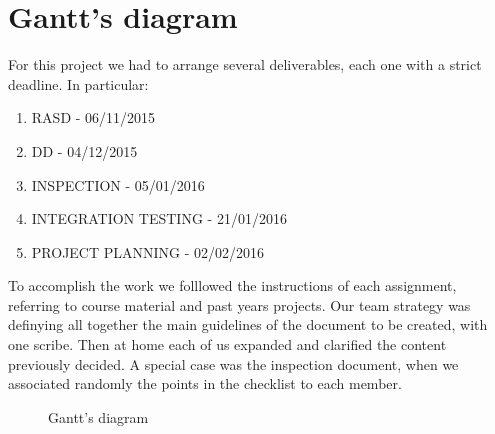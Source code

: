 \section{ Gantt's diagram}
For this project we had to arrange several deliverables, each one with a strict deadline.
In particular:
\begin{enumerate}
\item RASD - 06/11/2015
\item DD - 04/12/2015
\item INSPECTION - 05/01/2016
\item INTEGRATION TESTING - 21/01/2016
\item PROJECT PLANNING - 02/02/2016
\end{enumerate}

To accomplish the work we folllowed the instructions of each assignment, referring 
to course material and past years projects.
Our team strategy was definying  all together the main guidelines of the document to be created, with one 
scribe. Then at home each of us expanded and clarified the content previously decided.
A special case was the inspection document, when we associated randomly the points in the checklist to each member.

\begin{center}
\begin{figure} [h]

\noindent{}

\caption{Gantt's diagram}
 \end{figure}
\end{center}
